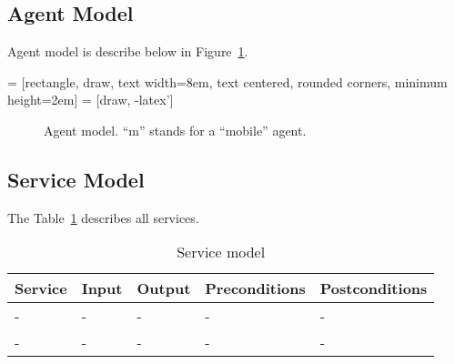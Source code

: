\documentclass[a4paper,11pt]{report}
\begin{document}
  \subsection{Agent Model}
  
  
  Agent model is describe below in Figure~\ref{figure:agent_model}.
  
 = [rectangle, draw, %
    text width=8em, text centered, rounded corners, minimum height=2em]
 = [draw, -latex']
    
\begin{figure}[ht!]
\caption{Agent model. ``m'' stands for a ``mobile'' agent.}
\label{figure:agent_model}
\end{figure}

  
  \subsection{Service Model}
  
  The Table~\ref{table:service_model} describes all services.
  
  \newcommand*{\thead}[1]{\multicolumn{1}{c}{\bfseries #1}}
  \begin{table}[ht!]
  \begin{tabular}{|l|l|l|l|l|}
  \thead{Service} & \thead{Input} & \thead{Output} & \thead{Preconditions} & \thead{Postconditions} \\\hline
  - & - & - & - & - \\ \hline
  - & - & - & - & - \\ \hline
  \end{tabular}
  
  \caption{Service model}
  \label{table:service_model}
  \end{table}
\end{document}
